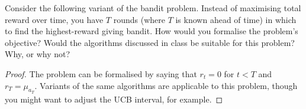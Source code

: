 \documentclass[twoside,a4paper]{article}
\begin{document}
\begin{exercise}
  Consider the following variant of the bandit problem.  Instead of maximising total reward over time, you have $T$ rounds (where $T$ is known ahead of time) in which to find the highest-reward giving bandit. How would you formalise the problem's objective? Would the algorithms discussed in class be suitable for this problem? Why, or why not?
\end{exercise}
\begin{proof}
  The problem can be formalised by saying that $r_t = 0$ for $t < T$ and $r_T = \mu_{a_{T}}$. Variants of the same algorithms are applicable to this problem, though you might want to adjust the UCB interval, for example. 
\end{proof}
\end{document}
